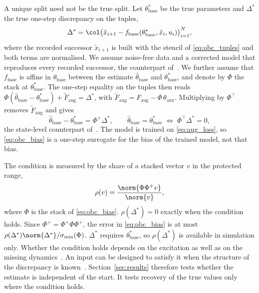 A unique split need not be the true split.
Let $\theta^*_{\mathrm{base}}$ be the true parameters and $\Delta^*$ the
true one-step discrepancy on the tuples,
\begin{equation}
 \Delta^*=\col\bigl(\tilde x_{i+1}-f_{\mathrm{base}}(\theta^*_{\mathrm{base}},
 \tilde x_i,u_i)\bigr)_{i=1}^{N},
\label{eq:obc_delta}
\end{equation}
where the recorded successor $\tilde x_{i+1}$ is built with the stencil of
\eqref{eq:obc_tuples} and both terms are normalised.
We assume noise-free data and a corrected model that reproduces every
recorded successor, the counterpart of~\cite[Assumption~6]{gyorok2026obc}.
We further assume that $f_{\mathrm{base}}$ is affine in
$\theta_{\mathrm{base}}$ between the estimate $\hat\theta_{\mathrm{base}}$
and $\theta^*_{\mathrm{base}}$, and denote by $\Phi$ the stack at
$\theta^*_{\mathrm{base}}$.
The one-step equality on the tuples then reads
$\Phi(\hat\theta_{\mathrm{base}}-\theta^*_{\mathrm{base}})+\tilde F_{\mathrm{aug}}=\Delta^*$,
with $\tilde F_{\mathrm{aug}}=F_{\mathrm{aug}}-\Phi\,\theta_{\mathrm{aux}}$.
Multiplying by $\Phi^\top$ removes $\tilde F_{\mathrm{aug}}$ and gives
\begin{equation}
 \hat\theta_{\mathrm{base}}-\theta^*_{\mathrm{base}}=\Phi^{+}\Delta^*,
 \qquad
 \hat\theta_{\mathrm{base}}=\theta^*_{\mathrm{base}}
 \;\Longleftrightarrow\;
 \Phi^\top\Delta^*=0,
\label{eq:obc_bias}
\end{equation}
the state-level counterpart of~\cite[Cond.~4, Eq.~(21)]{gyorok2026obc}.
The model is trained on \eqref{eq:aug_loss}, so \eqref{eq:obc_bias} is a
one-step surrogate for the bias of the trained model, not that bias.

The condition is measured by the share of a stacked vector $v$ in the
protected range,
\begin{equation}
 \rho(v)=\frac{\norm{\Phi\Phi^{+}v}}{\norm{v}},
\label{eq:obc_overlap}
\end{equation}
where $\Phi$ is the stack of \eqref{eq:obc_bias}.
$\rho(\Delta^*)=0$ exactly when the condition holds.
Since $\Phi^{+}=\Phi^{+}\Phi\Phi^{+}$, the error in \eqref{eq:obc_bias} is
at most $\rho(\Delta^*)\norm{\Delta^*}/\sigma_{\min}(\Phi)$.
$\Delta^*$ requires $\theta^*_{\mathrm{base}}$, so $\rho(\Delta^*)$ is
available in simulation only.
Whether the condition holds depends on the excitation as well as on the
missing dynamics~\cite[Sec.~4.1]{gyorok2026obc}.
An input can be designed to satisfy it when the structure of the
discrepancy is known~\cite[Remark~5]{gyorok2026obc}.
Section~\ref{sec:results} therefore tests whether the estimate is
independent of the start.
It tests recovery of the true values only where the condition holds.
